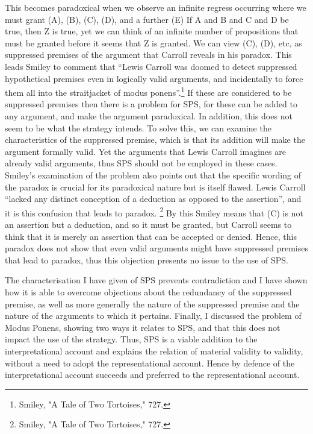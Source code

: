 \noindent This becomes paradoxical when we observe an infinite regress occurring
where we must grant (A), (B), (C), (D), and a further (E) If A and B and
C and D be true, then Z is true, yet we can think of an infinite number
of propositions that must be granted before it seems that Z is granted.
We can view (C), (D), etc, as suppressed premises of the argument that
Carroll reveals in his paradox. This leads Smiley to comment that
``Lewis Carroll was doomed to detect suppressed hypothetical premises
even in logically valid arguments, and incidentally to force them all
into the straitjacket of modus ponens''.\footnote{Smiley, "A Tale of Two
  Tortoises," 727.} If these are considered to be suppressed premises
then there is a problem for SPS, for these can be added to any argument,
and make the argument paradoxical. In addition, this does not seem to be
what the strategy intends. To solve this, we can examine the
characteristics of the suppressed premise, which is that its addition
will make the argument formally valid. Yet the arguments that Lewis
Carroll imagines are already valid arguments, thus SPS should not be
employed in these cases. Smiley's examination of the problem also points
out that the specific wording of the paradox is crucial for its
paradoxical nature but is itself flawed. Lewis Carroll ``lacked any
distinct conception of a deduction as opposed to the assertion'', and it
is this confusion that leads to paradox. \footnote{Smiley, "A Tale of
  Two Tortoises," 727.} By this Smiley means that (C) is not an
assertion but a deduction, and so it must be granted, but Carroll seems
to think that it is merely an assertion that can be accepted or denied.
Hence, this paradox does not show that even valid arguments might have
suppressed premises that lead to paradox, thus this objection presents
no issue to the use of SPS.

The characterisation I have given of SPS prevents contradiction and I
have shown how it is able to overcome objections about the redundancy of
the suppressed premise, as well as more generally the nature of the
suppressed premise and the nature of the arguments to which it pertains.
Finally, I discussed the problem of Modus Ponens, showing two ways it
relates to SPS, and that this does not impact the use of the strategy.
Thus, SPS is a viable addition to the interpretational account and
explains the relation of material validity to validity, without a need
to adopt the representational account. Hence by defence of the
interpretational account succeeds and preferred to the representational
account.

